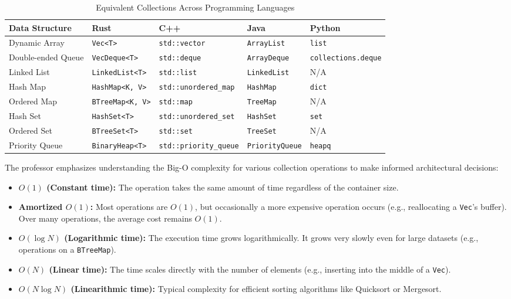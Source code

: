 \begin{table}[h!]
\centering
\begin{tabular}{|l|l|l|l|l|}
\hline
\textbf{Data Structure} & \textbf{Rust} & \textbf{C++} & \textbf{Java} & \textbf{Python} \\
\hline
Dynamic Array & \texttt{Vec<T>} & \texttt{std::vector} & \texttt{ArrayList} & \texttt{list} \\
Double-ended Queue & \texttt{VecDeque<T>} & \texttt{std::deque} & \texttt{ArrayDeque} & \texttt{collections.deque} \\
Linked List & \texttt{LinkedList<T>} & \texttt{std::list} & \texttt{LinkedList} & N/A \\
Hash Map & \texttt{HashMap<K, V>} & \texttt{std::unordered\_map} & \texttt{HashMap} & \texttt{dict} \\
Ordered Map & \texttt{BTreeMap<K, V>} & \texttt{std::map} & \texttt{TreeMap} & N/A \\
Hash Set & \texttt{HashSet<T>} & \texttt{std::unordered\_set} & \texttt{HashSet} & \texttt{set} \\
Ordered Set & \texttt{BTreeSet<T>} & \texttt{std::set} & \texttt{TreeSet} & N/A \\
Priority Queue & \texttt{BinaryHeap<T>} & \texttt{std::priority\_queue} & \texttt{PriorityQueue} & \texttt{heapq} \\
\hline
\end{tabular}
\caption{Equivalent Collections Across Programming Languages}
\label{tab:collections_comparison}
\end{table}

\begin{insightbox}
The professor emphasizes understanding the Big-O complexity for various collection operations to make informed architectural decisions:
\begin{itemize}
    \item \textbf{$O(1)$ (Constant time):} The operation takes the same amount of time regardless of the container size.
    \item \textbf{Amortized $O(1)$:} Most operations are $O(1)$, but occasionally a more expensive operation occurs (e.g., reallocating a \texttt{Vec}'s buffer). Over many operations, the average cost remains $O(1)$.
    \item \textbf{$O(\log N)$ (Logarithmic time):} The execution time grows logarithmically. It grows very slowly even for large datasets (e.g., operations on a \texttt{BTreeMap}).
    \item \textbf{$O(N)$ (Linear time):} The time scales directly with the number of elements (e.g., inserting into the middle of a \texttt{Vec}).
    \item \textbf{$O(N \log N)$ (Linearithmic time):} Typical complexity for efficient sorting algorithms like Quicksort or Mergesort.
\end{itemize}
\end{insightbox}


